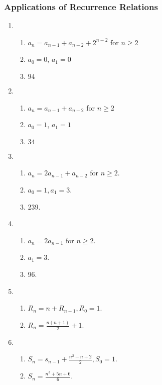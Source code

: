 \documentclass{../../cls/sig-alternate-05-2015}
\begin{document}
\subsubsection{Applications of Recurrence Relations}
\begin{enumerate}
\item \begin{enumerate}
	\item $a_n = a_{n-1} + a_{n-2} + 2^{n-2}$ for $n \geq 2$
	\item $a_0 = 0$, $a_1 = 0$
	\item $94$
\end{enumerate}

\item \begin{enumerate}
	\item $a_n = a_{n-1} + a_{n-2}$ for $n \geq 2$
	\item $a_0 = 1$, $a_1 = 1$
	\item $34$
\end{enumerate}

\item \begin{enumerate}
    \item $a_n  = 2 a_{n - 1} + a_{n - 2}$ for $n \ge 2$.
    \item $a_0 = 1, a_1 = 3$.
    \item 239.
\end{enumerate}

\item \begin{enumerate}
    \item $a_n  = 2 a_{n - 1}$ for $n \ge 2$.
    \item $a_1 = 3$.
    \item 96.
\end{enumerate}

\item \begin{enumerate}
    \item $R_n = n + R_{n - 1}, R_0 = 1$.
    \item $R_n = \frac{n(n + 1)}{2} + 1$.
\end{enumerate}

\item \begin{enumerate}
    \item $S_n = s_{n - 1} + \frac{n^2 - n + 2}{2}, S_0 = 1$.
    \item $S_n = \frac{n^3 + 5n + 6}{6}$.
\end{enumerate}


\end{enumerate}
\end{document}
